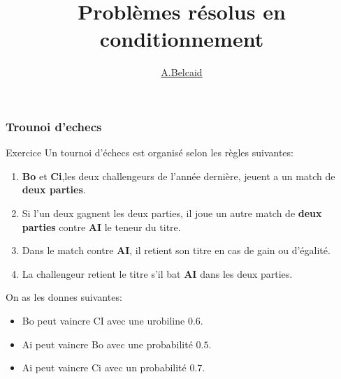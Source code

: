 \documentclass{beamer}
\title{Problèmes résolus en conditionnement}
\author{\underline{A.Belcaid}}
\institute{\small ENSA-Safi}
\begin{document}
\maketitle

\begin{frame}
\tableofcontents
\end{frame}

\begin{frame}[t]
  \frametitle{Trounoi d'echecs}
  \begin{block}{Exercice}
    \small
    Un tournoi d'échecs est organisé selon les règles suivantes:
    \begin{enumerate}
      \item \textbf{Bo} et \textbf{Ci},les deux challengeurs de l'année dernière,
      jeuent a un match de \textbf{deux parties}.
    \item Si l'un deux gagnent les deux parties, il joue un autre match de
      \textbf{deux parties} contre
      \textbf{AI} le teneur du titre.
    \item Dans le match contre \textbf{AI}, il retient son titre en cas de gain
      ou d'égalité.
    \item La challengeur retient le titre s'il bat \textbf{AI} dans les deux
      parties.
    \end{enumerate}
  \end{block}

    On as les donnes suivantes:
    \begin{itemize}
      \item Bo peut vaincre  CI avec une urobiline $\mathbf{0.6}$.
      \item Ai peut vaincre Bo avec une probabilité $\mathbf{0.5}$.
      \item Ai peut vaincre Ci avec un probabilité $\mathbf{0.7}$.
    \end{itemize}
\end{frame}
\end{document}
